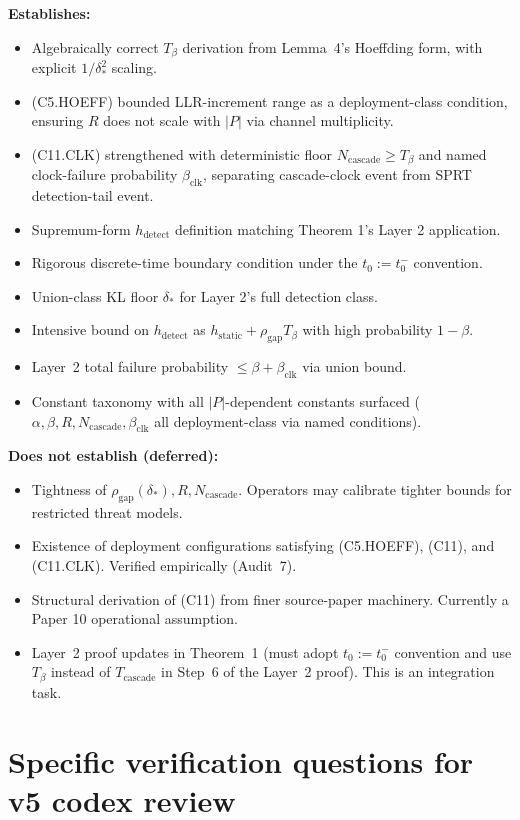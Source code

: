 \documentclass{article}
\newcommand{\deltastar}{\delta_{*}}
\newcommand{\rhogap}{\rho_{\mathrm{gap}}}
\newcommand{\Tbeta}{T_{\beta}}
\newcommand{\Ncasc}{N_{\mathrm{cascade}}}
\newcommand{\bclk}{\beta_{\mathrm{clk}}}
\begin{document}
\textbf{Establishes:}
\begin{itemize}
\item Algebraically correct $\Tbeta$ derivation from Lemma~4's
  Hoeffding form, with explicit $1/\deltastar^2$ scaling.
\item (C5.HOEFF) bounded LLR-increment range as a deployment-class
  condition, ensuring $R$ does not scale with $|P|$ via channel
  multiplicity.
\item (C11.CLK) strengthened with deterministic floor $\Ncasc \geq
  \Tbeta$ and named clock-failure probability $\bclk$, separating
  cascade-clock event from SPRT detection-tail event.
\item Supremum-form $h_{\mathrm{detect}}$ definition matching
  Theorem 1's Layer 2 application.
\item Rigorous discrete-time boundary condition under the
  $t_0 := t_0^-$ convention.
\item Union-class KL floor $\deltastar$ for Layer 2's full
  detection class.
\item Intensive bound on $h_{\mathrm{detect}}$ as $h_{\mathrm{static}}
  + \rhogap \Tbeta$ with high probability $1-\beta$.
\item Layer~2 total failure probability $\leq \beta + \bclk$ via
  union bound.
\item Constant taxonomy with all $|P|$-dependent constants surfaced
  ($\alpha, \beta, R, \Ncasc, \bclk$ all deployment-class via
  named conditions).
\end{itemize}

\textbf{Does not establish (deferred):}
\begin{itemize}
\item Tightness of $\rhogap(\deltastar), R, \Ncasc$.  Operators
  may calibrate tighter bounds for restricted threat models.
\item Existence of deployment configurations satisfying (C5.HOEFF),
  (C11), and (C11.CLK).  Verified empirically (Audit~7).
\item Structural derivation of (C11) from finer source-paper
  machinery.  Currently a Paper 10 operational assumption.
\item Layer~2 proof updates in Theorem~1 (must adopt $t_0 := t_0^-$
  convention and use $\Tbeta$ instead of $T_{\mathrm{cascade}}$ in
  Step~6 of the Layer~2 proof).  This is an integration task.
\end{itemize}

\section{Specific verification questions for v5 codex review}
\end{document}
